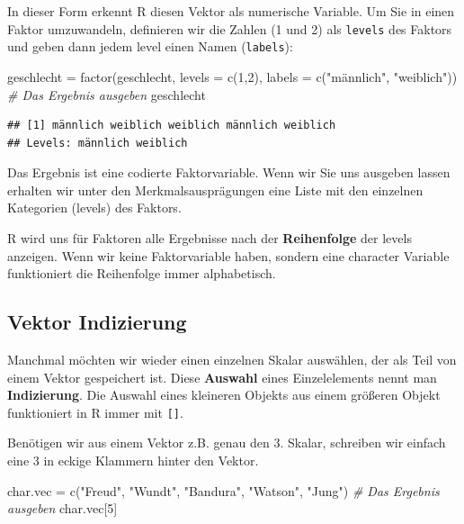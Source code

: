 \documentclass[
]{book}
\newenvironment{Shaded}{\begin{snugshade}}{\end{snugshade}}
\newcommand{\AttributeTok}[1]{\textcolor[rgb]{0.77,0.63,0.00}{#1}}
\newcommand{\CommentTok}[1]{\textcolor[rgb]{0.56,0.35,0.01}{\textit{#1}}}
\newcommand{\DecValTok}[1]{\textcolor[rgb]{0.00,0.00,0.81}{#1}}
\newcommand{\FunctionTok}[1]{\textcolor[rgb]{0.00,0.00,0.00}{#1}}
\newcommand{\NormalTok}[1]{#1}
\newcommand{\OtherTok}[1]{\textcolor[rgb]{0.56,0.35,0.01}{#1}}
\newcommand{\StringTok}[1]{\textcolor[rgb]{0.31,0.60,0.02}{#1}}
\begin{document}
In dieser Form erkennt R diesen Vektor als numerische Variable. Um Sie in einen Faktor umzuwandeln, definieren wir die Zahlen (1 und 2) als \texttt{levels} des Faktors und geben dann jedem level einen Namen (\texttt{labels}):

\begin{Shaded}
\begin{Highlighting}[]
\NormalTok{geschlecht }\OtherTok{=} \FunctionTok{factor}\NormalTok{(geschlecht, }\AttributeTok{levels =} \FunctionTok{c}\NormalTok{(}\DecValTok{1}\NormalTok{,}\DecValTok{2}\NormalTok{), }\AttributeTok{labels =} \FunctionTok{c}\NormalTok{(}\StringTok{"männlich"}\NormalTok{, }\StringTok{"weiblich"}\NormalTok{))}
\CommentTok{\# Das Ergebnis ausgeben}
\NormalTok{geschlecht}
\end{Highlighting}
\end{Shaded}

\begin{verbatim}
## [1] männlich weiblich weiblich männlich weiblich
## Levels: männlich weiblich
\end{verbatim}

Das Ergebnis ist eine codierte Faktorvariable. Wenn wir Sie uns ausgeben lassen erhalten wir unter den Merkmalsausprägungen eine Liste mit den einzelnen Kategorien (levels) des Faktors.

R wird uns für Faktoren alle Ergebnisse nach der \textbf{Reihenfolge} der levels anzeigen. Wenn wir keine Faktorvariable haben, sondern eine character Variable funktioniert die Reihenfolge immer alphabetisch.

\hypertarget{vektor-indizierung}{%
\subsection{Vektor Indizierung}\label{vektor-indizierung}}

Manchmal möchten wir wieder einen einzelnen Skalar auswählen, der als Teil von einem Vektor gespeichert ist. Diese \textbf{Auswahl} eines Einzelelements nennt man \textbf{Indizierung}. Die Auswahl eines kleineren Objekts aus einem größeren Objekt funktioniert in R immer mit \texttt{{[}{]}}.

Benötigen wir aus einem Vektor z.B. genau den 3. Skalar, schreiben wir einfach eine 3 in eckige Klammern hinter den Vektor.

\begin{Shaded}
\begin{Highlighting}[]
\NormalTok{char.vec }\OtherTok{=} \FunctionTok{c}\NormalTok{(}\StringTok{"Freud"}\NormalTok{, }\StringTok{"Wundt"}\NormalTok{, }\StringTok{"Bandura"}\NormalTok{, }\StringTok{"Watson"}\NormalTok{, }\StringTok{"Jung"}\NormalTok{)}
\CommentTok{\# Das Ergebnis ausgeben}
\NormalTok{char.vec[}\DecValTok{5}\NormalTok{]}
\end{Highlighting}
\end{Shaded}
\end{document}
